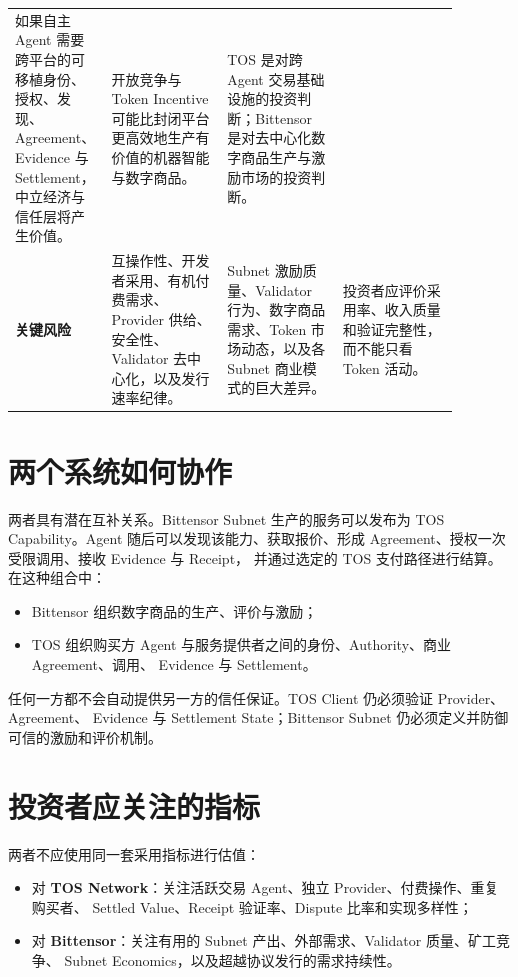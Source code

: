 \documentclass[UTF8,11pt,fontset=fandol]{ctexart}
\begin{document}
\begin{landscape}
\begin{longtable}{P{0.13\linewidth}P{0.25\linewidth}P{0.25\linewidth}P{0.25\linewidth}}
如果自主 Agent 需要跨平台的可移植身份、授权、发现、Agreement、Evidence 与 Settlement，
中立经济与信任层将产生价值。 &
开放竞争与 Token Incentive 可能比封闭平台更高效地生产有价值的机器智能与数字商品。 &
TOS 是对跨 Agent 交易基础设施的投资判断；Bittensor 是对去中心化数字商品生产与激励市场的投资判断。 \\
\textbf{关键风险} &
互操作性、开发者采用、有机付费需求、Provider 供给、安全性、Validator 去中心化，以及发行速率纪律。 &
Subnet 激励质量、Validator 行为、数字商品需求、Token 市场动态，以及各 Subnet 商业模式的巨大差异。 &
投资者应评价采用率、收入质量和验证完整性，而不能只看 Token 活动。 \\
\bottomrule
\end{longtable}
\end{landscape}

\section{两个系统如何协作}

两者具有潜在互补关系。Bittensor Subnet 生产的服务可以发布为 TOS Capability。Agent
随后可以发现该能力、获取报价、形成 Agreement、授权一次受限调用、接收 Evidence 与 Receipt，
并通过选定的 TOS 支付路径进行结算。在这种组合中：

\begin{itemize}
  \item Bittensor 组织数字商品的生产、评价与激励；
  \item TOS 组织购买方 Agent 与服务提供者之间的身份、Authority、商业 Agreement、调用、
        Evidence 与 Settlement。
\end{itemize}

任何一方都不会自动提供另一方的信任保证。TOS Client 仍必须验证 Provider、Agreement、
Evidence 与 Settlement State；Bittensor Subnet 仍必须定义并防御可信的激励和评价机制。

\section{投资者应关注的指标}

两者不应使用同一套采用指标进行估值：

\begin{itemize}
  \item 对 \textbf{TOS Network}：关注活跃交易 Agent、独立 Provider、付费操作、重复购买者、
        Settled Value、Receipt 验证率、Dispute 比率和实现多样性；
  \item 对 \textbf{Bittensor}：关注有用的 Subnet 产出、外部需求、Validator 质量、矿工竞争、
        Subnet Economics，以及超越协议发行的需求持续性。
\end{itemize}
\end{document}
